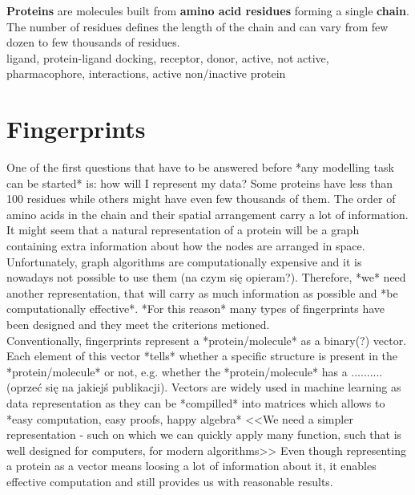 \documentclass[a4paper,10pt]{report}
\begin{document}
    \textbf{Proteins} are molecules built from \textbf{amino acid residues} forming a single \textbf{chain}. The number of residues defines the length of the chain and can vary from few dozen to few thousands of residues.\\
    
        
    ligand, protein-ligand docking, receptor, donor, active, not active, pharmacophore, interactions, active non/inactive protein\\ %
    \section{Fingerprints} %
    One of the first questions that have to be answered before *any modelling task can be started* is: how will I represent my data? Some proteins have less than 100 residues while others might have even few thousands of them. The order of amino acids in the chain and their spatial arrangement carry a lot of information. It might seem that a natural representation of a protein will be a graph containing extra information about how the nodes are arranged in space. Unfortunately, graph algorithms are computationally expensive and it is nowadays not possible to use them (na czym się opieram?). Therefore, *we* need another representation, that will carry as much information as possible and *be computationally effective*. *For this reason* many types of fingerprints have been designed and they meet the criterions metioned.\\
    
    Conventionally, fingerprints represent a *protein/molecule* as a binary(?) vector. Each element of this vector *tells* whether a specific structure is present in the *protein/molecule* or not, e.g. whether the *protein/molecule* has a .......... (oprzeć się na jakiejś publikacji). Vectors are widely used in machine learning as data representation as they can be *compilled* into matrices which allows to *easy computation, easy proofs, happy algebra* <<We need a simpler representation - such on which we can quickly apply many function, such that is well designed for computers, for modern algorithms>> Even though representing a protein as a vector means loosing a lot of information about it, it enables effective computation and still provides us with reasonable results.\\
    
    
\end{document}
